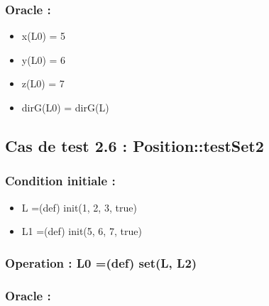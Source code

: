 \documentclass[11pt]{article}
\begin{document}
\subsubsection{Oracle :}
\label{sec-1.6.3}

\begin{itemize}

\item x(L0) = 5\\
\label{sec-1.6.3.1}


\item y(L0) = 6\\
\label{sec-1.6.3.2}


\item z(L0) = 7\\
\label{sec-1.6.3.3}


\item dirG(L0) = dirG(L)\\
\label{sec-1.6.3.4}


\end{itemize} %
\subsection{Cas de test 2.6 : Position::testSet2}
\label{sec-1.7}

\subsubsection{Condition initiale :}
\label{sec-1.7.1}

\begin{itemize}

\item L =(def) init(1, 2, 3, true)\\
\label{sec-1.7.1.1}


\item L1 =(def) init(5, 6, 7, true)\\
\label{sec-1.7.1.2}

\end{itemize} %
\subsubsection{Operation : L0 =(def) set(L, L2)}
\label{sec-1.7.2}

\subsubsection{Oracle :}
\label{sec-1.7.3}
\end{document}
